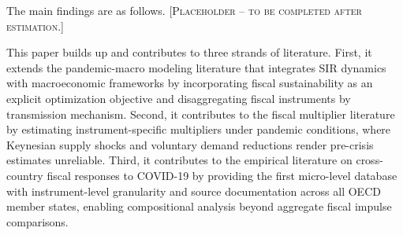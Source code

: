 \documentclass[12pt, a4paper]{article}
\begin{document}

The main findings are as follows. \textsc{[Placeholder -- to be completed after
estimation.]}





This paper builds up and contributes to three strands of literature. First, it extends the pandemic-macro modeling literature that integrates SIR dynamics with macroeconomic frameworks \citet{Atkeson2020, eichenbaum2021macro, alvarez2021, KaplanMollViolante2020, Jones2021, acemoglu2021} by incorporating fiscal sustainability as an explicit optimization objective and disaggregating fiscal instruments by transmission mechanism. Second, it contributes to the fiscal multiplier literature \citet{blanchard2002, ramey2018, romer2010} by estimating instrument-specific multipliers under pandemic conditions, where Keynesian supply shocks \citet{guerrieri2022} and voluntary demand reductions \citet{GOOLSBEE2021} render pre-crisis estimates unreliable. Third, it contributes to the empirical literature on cross-country fiscal responses to COVID-19 \citet{deb2021,chetty2020, Autor2022} by providing the first micro-level database with instrument-level granularity and source documentation across all OECD member states, enabling compositional analysis beyond aggregate fiscal impulse comparisons.
\end{document}
